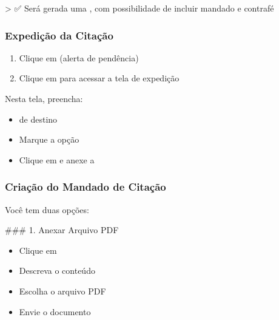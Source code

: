 \documentclass[letterpaper,10pt,brazil]{sphinxmanual}
\begin{document}
\sphinxAtStartPar
\textgreater{} ✅ Será gerada uma , com possibilidade de incluir mandado e contrafé


\subsubsection{Expedição da Citação}
\label{\detokenize{projud_30_cita_xe7_xe3oeletronica:expedicao-da-citacao}}\begin{enumerate}
%
\item {} 
\sphinxAtStartPar
Clique em  (alerta de pendência)

\item {} 
\sphinxAtStartPar
Clique em  para acessar a tela de expedição

\end{enumerate}

\sphinxAtStartPar
Nesta tela, preencha:
\begin{itemize}
\item {} 
\sphinxAtStartPar
{} de destino

\item {} 
\sphinxAtStartPar
Marque a opção 

\item {} 
\sphinxAtStartPar
Clique em  e anexe a 

\end{itemize}


\subsubsection{Criação do Mandado de Citação}
\label{\detokenize{projud_30_cita_xe7_xe3oeletronica:criacao-do-mandado-de-citacao}}
\sphinxAtStartPar
Você tem duas opções:

\sphinxAtStartPar
\#\#\# 1. Anexar Arquivo PDF
\begin{itemize}
\item {} 
\sphinxAtStartPar
Clique em 

\item {} 
\sphinxAtStartPar
Descreva o conteúdo

\item {} 
\sphinxAtStartPar
Escolha o arquivo PDF

\item {} 
\sphinxAtStartPar
Envie o documento

\end{itemize}
\end{document}
